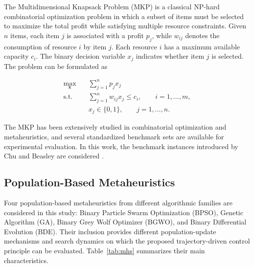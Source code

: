\documentclass[journal,article,submit,moreauthors]{Definitions/mdpi}
\begin{document}
The Multidimensional Knapsack Problem (MKP) is a classical NP-hard
combinatorial optimization problem in which a subset of items must be selected
to maximize the total profit while satisfying multiple resource constraints.
Given $n$ items, each item $j$ is associated with a profit $p_j$, while
$w_{ij}$ denotes the consumption of resource $i$ by item $j$. Each resource
$i$ has a maximum available capacity $c_i$. The binary decision variable
$x_j$ indicates whether item $j$ is selected. The problem can be formulated
as

\begin{equation}
\begin{aligned}
\max_{\mathbf{x}} \quad
    & \sum_{j=1}^{n} p_j x_j \\
\text{s.t.} \quad
    & \sum_{j=1}^{n} w_{ij}x_j \leq c_i,
      \qquad i=1,\ldots,m, \\
    & x_j \in \{0,1\},
      \qquad j=1,\ldots,n.
\end{aligned}
\end{equation}

The MKP has been extensively studied in combinatorial optimization and
metaheuristics, and several standardized benchmark sets are available for
experimental evaluation. In this work, the benchmark instances introduced
by Chu and Beasley are considered \cite{chu1998genetic}.

\subsection{Population-Based Metaheuristics}

Four population-based metaheuristics from different algorithmic families are
considered in this study: Binary Particle Swarm Optimization (BPSO), Genetic
Algorithm (GA), Binary Grey Wolf Optimizer (BGWO), and Binary Differential
Evolution (BDE). Their inclusion provides different population-update
mechanisms and search dynamics on which the proposed trajectory-driven control
principle can be evaluated. Table~\ref{tab:mhs} summarizes their main
characteristics.
\end{document}
